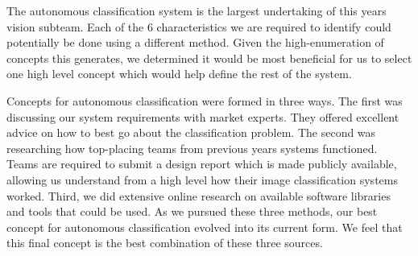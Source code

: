\documentclass[]{auvsi_doc}
\begin{document}
The autonomous classification system is the largest undertaking of this years vision subteam. Each of the 6 characteristics we are required to identify could potentially be done using a different method. Given the high-enumeration of concepts this generates, we determined it would be most beneficial for us to select one high level concept which would help define the rest of the system.

Concepts for autonomous classification were formed in three ways. The first was discussing our system requirements with market experts. They offered excellent advice on how to best go about the classification problem. The second was researching how top-placing teams from previous years systems functioned. Teams are required to submit a design report which is made publicly available, allowing us understand from a high level how their image classification systems worked. Third, we did extensive online research on available software libraries and tools that could be used. As we pursued these three methods, our best concept for autonomous classification evolved into its current form. We feel that this final concept is the best combination of these three sources.
\end{document}
